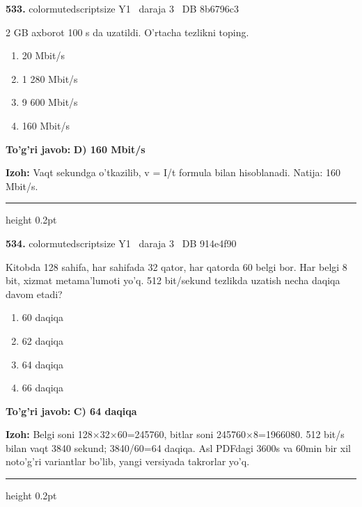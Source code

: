 \documentclass[10pt,a4paper,oneside]{article}
\begin{document}
\noindent\textbf{\color{ink}533.}  {color{muted}scriptsize Y1 \textbullet\ daraja 3 \textbullet\ DB 8b6796c3}
\par
2 GB axborot 100 s da uzatildi. O'rtacha tezlikni toping.
\begin{enumerate}[label=\Alph*),leftmargin=9mm]
\item 20 Mbit/s
\item 1 280 Mbit/s
\item 9 600 Mbit/s
\item 160 Mbit/s
\end{enumerate}
\begin{tcolorbox}[enhanced,breakable,colback=teal!4,colframe=teal!50!black,boxrule=0.5pt,arc=1.1mm,left=3mm,right=3mm,top=1.7mm,bottom=1.7mm,before skip=2mm,after skip=2mm]
\textbf{\color{teal}To'g'ri javob:} \textbf{D) 160 Mbit/s}
\par\smallskip
\textbf{Izoh:} Vaqt sekundga o'tkazilib, v = I/t formula bilan hisoblanadi. Natija: 160 Mbit/s.
\end{tcolorbox}
\vspace{2mm}\hrule height 0.2pt \vspace{3mm}

\noindent\textbf{\color{ink}534.}  {color{muted}scriptsize Y1 \textbullet\ daraja 3 \textbullet\ DB 914e4f90}
\par
Kitobda 128 sahifa, har sahifada 32 qator, har qatorda 60 belgi bor. Har belgi 8 bit, xizmat metama'lumoti yo'q. 512 bit/sekund tezlikda uzatish necha daqiqa davom etadi?
\begin{enumerate}[label=\Alph*),leftmargin=9mm]
\item 60 daqiqa
\item 62 daqiqa
\item 64 daqiqa
\item 66 daqiqa
\end{enumerate}
\begin{tcolorbox}[enhanced,breakable,colback=teal!4,colframe=teal!50!black,boxrule=0.5pt,arc=1.1mm,left=3mm,right=3mm,top=1.7mm,bottom=1.7mm,before skip=2mm,after skip=2mm]
\textbf{\color{teal}To'g'ri javob:} \textbf{C) 64 daqiqa}
\par\smallskip
\textbf{Izoh:} Belgi soni 128\ensuremath{\times}32\ensuremath{\times}60=245760, bitlar soni 245760\ensuremath{\times}8=1966080. 512 bit/s bilan vaqt 3840 sekund; 3840/60=64 daqiqa. Asl PDFdagi 3600s va 60min bir xil noto'g'ri variantlar bo'lib, yangi versiyada takrorlar yo'q.
\end{tcolorbox}
\vspace{2mm}\hrule height 0.2pt \vspace{3mm}
\end{document}

